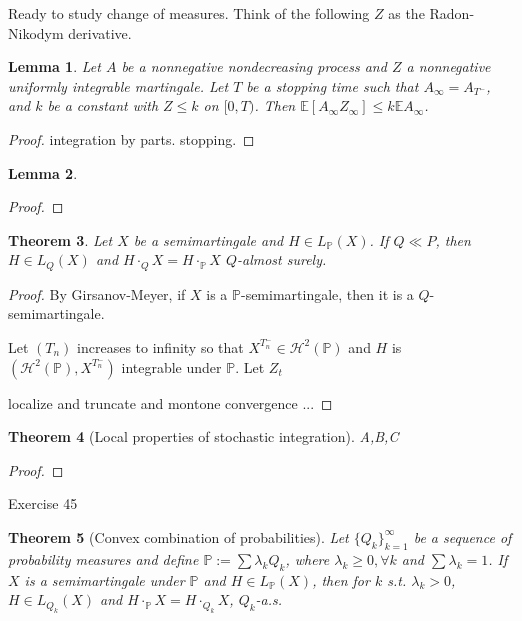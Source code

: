 \documentclass[openany,oneside]{book}
\newtheorem{thm}{Theorem}[section]
\newtheorem{lem}[thm]{Lemma}
\theoremstyle{definition}
\theoremstyle{remark}
\newcommand{\E}{\mathbb{E}} %
\renewcommand{\P}{\mathbb{P}} %
\DeclarePairedDelimiter{\norm}{\lVert}{\rVert} %
\renewcommand{\d}{\mathrm{d}} %
\newcommand{\sH}[1][2]{\mathcal{H}^{#1}} %
\begin{document}
Ready to study change of measures. Think of the following $Z$ as the Radon-Nikodym derivative.
\begin{lem}
Let $A$ be a nonnegative nondecreasing process and $Z$ a nonnegative uniformly integrable martingale. Let $T$ be a stopping time such that $A_\infty = A_{T^-}$, and $k$ be a constant with $Z\le k$ on $[0,T)$. Then $\E[A_\infty Z_\infty] \le k \E A_\infty$.
\end{lem}
\begin{proof}
integration by parts. stopping.
\end{proof}

\begin{lem}
\end{lem}
\begin{proof}

\end{proof}

\begin{thm}
Let $X$ be a semimartingale and $H\in L_{\P}(X)$. If $Q\ll P$, then $H\in L_Q(X)$ and $H\cdot_Q X = H\cdot_{\P} X$ $Q$-almost surely.
\end{thm}
\begin{proof}
By Girsanov-Meyer, if $X$ is a $\P$-semimartingale, then it is a $Q$-semimartingale.
\par
Let $(T_n)$ increases to infinity so that $X^{T_n^-} \in \sH(\P)$ and $H$ is $(\sH(\P),X^{T_n^-})$ integrable under $\P$. Let $Z_t$
\par
localize and truncate and montone convergence ...
\end{proof}

\begin{thm}[Local properties of stochastic integration]
A,B,C
\end{thm}
\begin{proof}


\end{proof}

Exercise 45


\begin{thm}[Convex combination of probabilities]
Let $\{Q_k\}_{k=1}^\infty$ be a sequence of probability measures and define $\P:=\sum \lambda_k Q_k$, where $\lambda_k \ge 0, \forall k$ and $\sum \lambda_k = 1$. If $X$ is a semimartingale under $\P$ and $H\in L_{\P}(X)$, then for $k$ s.t. $\lambda_k >0$, $H\in L_{Q_k}(X)$ and $H\cdot_{\P} X = H\cdot_{Q_k} X$, $Q_k$-a.s.
\end{thm}
\end{document}
